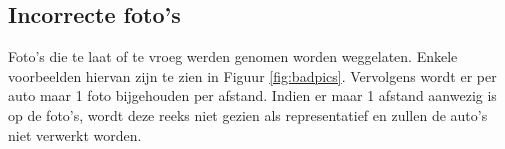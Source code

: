
\subsection{Incorrecte foto's}
Foto's die te laat of te vroeg werden genomen worden weggelaten. Enkele voorbeelden hiervan zijn te zien in Figuur \ref{fig:badpics}. Vervolgens wordt er per auto maar 1 foto bijgehouden per afstand. Indien er maar 1 afstand aanwezig is op de foto's, wordt deze reeks niet gezien als representatief en zullen de auto's niet verwerkt worden.

